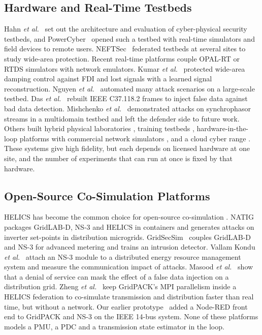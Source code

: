 \documentclass[journal]{IEEEtran}
\begin{document}
\subsection{Hardware and Real-Time Testbeds}

Hahn \emph{et al.}~\cite{hahn2013} set out the architecture and evaluation of cyber-physical security testbeds, and PowerCyber~\cite{ashok2016powercyber} opened such a testbed with real-time simulators and field devices to remote users. NEFTSec~\cite{singh2022neftsec} federated testbeds at several sites to study wide-area protection. Recent real-time platforms couple OPAL-RT or RTDS simulators with network emulators. Kumar \emph{et al.}~\cite{kumar2025rtcptc} protected wide-area damping control against FDI and lost signals with a learned signal reconstruction. Nguyen \emph{et al.}~\cite{nguyen2024rtcps} automated many attack scenarios on a large-scale testbed. Das \emph{et al.}~\cite{das2025scalable} rebuilt IEEE C37.118.2 frames to inject false data against bad data detection. Mishchenko \emph{et al.}~\cite{mishchenko2024multidomain} demonstrated attacks on synchrophasor streams in a multidomain testbed and left the defender side to future work. Others built hybrid physical laboratories \cite{abdelrahman2023hybrid}, training testbeds \cite{chamana2023integrated}, hardware-in-the-loop platforms with commercial network simulators \cite{wang2024hil}, and a cloud cyber range \cite{chng2024craas}. These systems give high fidelity, but each depends on licensed hardware at one site, and the number of experiments that can run at once is fixed by that hardware.

\subsection{Open-Source Co-Simulation Platforms}

HELICS has become the common choice for open-source co-simulation \cite{hardy2024helics}. NATIG~\cite{bel2024natig} packages GridLAB-D, NS-3 and HELICS in containers and generates attacks on inverter set-points in distribution microgrids. GridSecSim~\cite{thioub2026gridsecsim} couples GridLAB-D and NS-3 for advanced metering and trains an intrusion detector. Vallam Kondu \emph{et al.}~\cite{vallamkondu2025der} attach an NS-3 module to a distributed energy resource management system and measure the communication impact of attacks. Masood \emph{et al.}~\cite{masood2026cosim} show that a denial of service can mask the effect of a false data injection on a distribution grid. Zheng \emph{et al.}~\cite{zheng2024hpc} keep GridPACK's MPI parallelism inside a HELICS federation to co-simulate transmission and distribution faster than real time, but without a network. Our earlier prototype~\cite{islam2024remotely} added a Node-RED front end to GridPACK and NS-3 on the IEEE 14-bus system. None of these platforms models a PMU, a PDC and a transmission state estimator in the loop.
\end{document}
